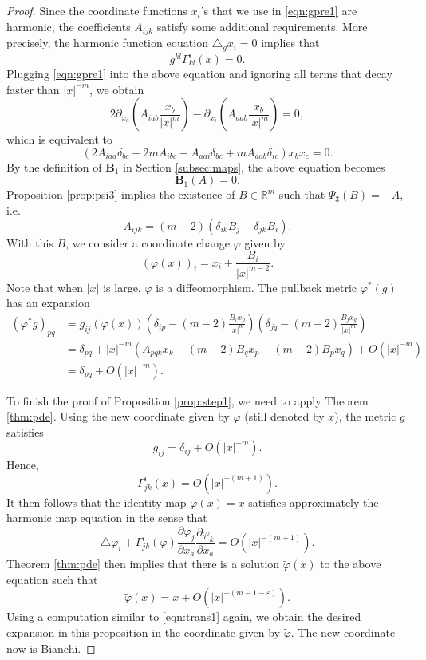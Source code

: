 \documentclass{amsart}
\newcommand{\abs}[1]{\left\vert#1\right\vert}
\newcommand{\Real}{\mathbb R}
\newcommand{\pfrac}[2]{\frac{\partial #1}{\partial #2}}
\numberwithin{equation}{section}
\begin{document}
\begin{proof}
	Since the coordinate functions $x_i$'s that we use in \eqref{eqn:gpre1} are harmonic, the coefficients $A_{ijk}$ satisfy some additional requirements. More precisely, the harmonic function equation $\triangle_g x_i =0$ implies that
	\[
		g^{kl} \Gamma^i_{kl}(x) =0.
	\]
	Plugging \eqref{eqn:gpre1} into the above equation and ignoring all terms that decay faster than $\abs{x}^{-m}$, we obtain
	\[
		2 \partial_{x_a} \left( A_{iab}\frac{x_b}{\abs{x}^m} \right) - \partial_{x_i} \left( A_{aab}\frac{x_b}{\abs{x}^m} \right)=0,
	\]
	which is equivalent to
	\[
		(2A_{iaa}\delta_{bc} - 2mA_{ibc}- A_{aai}\delta_{bc}+m A_{aab}\delta_{ic}) x_bx_c=0.
	\]
	By the definition of ${\mathbf B}_1$ in Section \ref{subsec:maps}, the above equation becomes
	\[
		{\mathbf B}_1(A)=0.
	\]
	Proposition \ref{prop:psi3} implies the existence of $B\in \Real^m$ such that $\Psi_3(B)=-A$, i.e.
	\[
		A_{ijk}=(m-2)(\delta_{ik}B_j + \delta_{jk}B_i).
	\]
	With this $B$, we consider a coordinate change $\varphi$ given by
	\[
		(\varphi(x))_i= x_i+ \frac{B_i}{\abs{x}^{m-2}}.
	\]
	Note that when $\abs{x}$ is large, $\varphi$ is a diffeomorphism. The pullback metric $\varphi^*(g)$ has an expansion
	\begin{equation}
		\label{eqn:trans1}
		\begin{split}
			(\varphi^* g)_{pq} &=g_{ij}(\varphi(x)) \left( \delta_{ip} - (m-2)\frac{B_ix_p}{\abs{x}^{m}} \right) \left( \delta_{jq} - (m-2) \frac{B_j x_q}{\abs{x}^{m}} \right) \\
					   &= \delta_{pq} + \abs{x}^{-m} \left( A_{pqk}x_k - (m-2)B_q x_p -(m-2) B_px_q \right) + O(\abs{x}^{-m}) \\
					   &= \delta_{pq}+ O(\abs{x}^{-m}).
		\end{split}
	\end{equation}

	To finish the proof of Proposition \ref{prop:step1}, we need to apply Theorem \ref{thm:pde}. Using the new coordinate given by $\varphi$ (still denoted by $x$), the metric $g$ satisfies
	\begin{equation}
		\label{eqn:gijgood}
		g_{ij}=\delta_{ij}+O(\abs{x}^{-m}).
	\end{equation}
	Hence, 
	\[
		\Gamma^i_{jk}(x) = O(\abs{x}^{-(m+1)}).
	\]
	It then follows that the identity map $\varphi(x)=x$ satisfies approximately the harmonic map equation in the sense that
	\begin{equation}
		\label{eqn:bian}
		\triangle \varphi_i + \Gamma^i_{jk}(\varphi) \pfrac{\varphi_j}{x_a} \pfrac{\varphi_k}{x_a}  = O(\abs{x}^{-(m+1)}).
	\end{equation}
	Theorem \ref{thm:pde} then implies that there is a solution $\tilde{\varphi}(x)$ to the above equation such that
	\[
		\tilde{\varphi}(x)= x + O(\abs{x}^{-(m-1-\varepsilon)}).
	\]
	Using a computation similar to \eqref{eqn:trans1} again, we obtain the desired expansion in this proposition in the coordinate given by $\tilde{\varphi}$. The new coordinate now is Bianchi. 
\end{proof}
\end{document}
